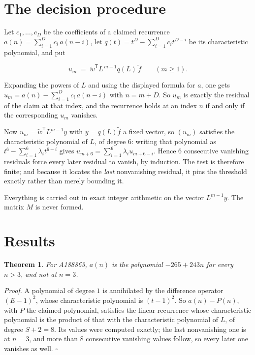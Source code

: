 \documentclass[11pt]{article}
\newtheorem{theorem}{Theorem}
\theoremstyle{definition}
\begin{document}
\section{The decision procedure}

Let $c_1,\dots,c_D$ be the coefficients of a claimed recurrence $a(n) = \sum_{i=1}^{D} c_i\,a(n-i)$, let $q(t) = t^{D} - \sum_{i=1}^{D} c_i t^{D-i}$ be its characteristic polynomial, and put

\[u_m \;=\; \tilde w^{\mathsf T} L^{\,m-1} q(L)\,\tilde f \qquad (m \ge 1).\]

Expanding the powers of $L$ and using the displayed formula for $a$, one gets $u_m = a(n) - \sum_{i=1}^{D} c_i\,a(n-i)$ with $n = m + D$. So $u_m$ is exactly the residual of the claim at that index, and the recurrence holds at an index $n$ if and only if the corresponding $u_m$ vanishes.

Now $u_m = \tilde w^{\mathsf T} L^{m-1} y$ with $y = q(L)\tilde f$ a fixed vector, so $(u_m)$ satisfies the characteristic polynomial of $L$, of degree $6$: writing that polynomial as $t^{6} - \sum_{i=1}^{6} \lambda_i t^{6-i}$ gives $u_{m+6} = \sum_{i=1}^{6} \lambda_i u_{m+6-i}$. Hence $6$ consecutive vanishing residuals force every later residual to vanish, by induction. The test is therefore finite; and because it locates the {\itshape last} nonvanishing residual, it pins the threshold exactly rather than merely bounding it.

Everything is carried out in exact integer arithmetic on the vector $L^{m-1}y$. The matrix $M$ is never formed.

\section{Results}

\begin{theorem} For A188863, $a(n)$ is the polynomial $-265 + 243n$ for every $n > 3$, and not at $n = 3$.\end{theorem}

{\itshape Proof.} A polynomial of degree $1$ is annihilated by the difference operator $(E-1)^{2}$, whose characteristic polynomial is $(t-1)^{2}$. So $a(n) - P(n)$, with $P$ the claimed polynomial, satisfies the linear recurrence whose characteristic polynomial is the product of that with the characteristic polynomial of $L$, of degree $S + 2 = 8$. Its values were computed exactly; the last nonvanishing one is at $n = 3$, and more than $8$ consecutive vanishing values follow, so every later one vanishes as well. $\square$
\end{document}
